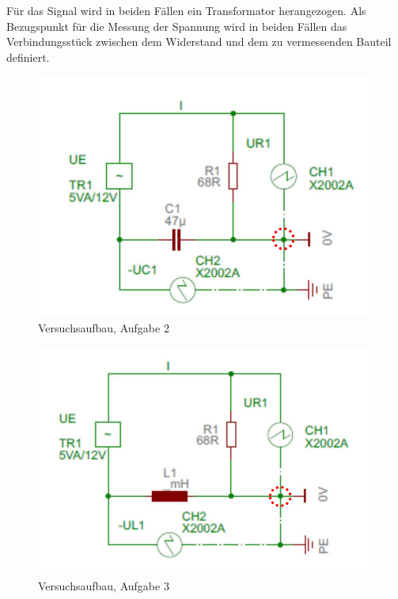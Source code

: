 \documentclass{article}
\begin{document}
Für das Signal wird in beiden Fällen ein Transformator herangezogen. Als Bezugspunkt für die Messung der Spannung wird in beiden Fällen das Verbindungsstück zwischen dem Widerstand und dem zu vermessenden Bauteil definiert.

\begin{figure}[H]
\centering
\caption{Versuchsaufbau, Aufgabe 2}
\label{fig:aufbau_task2}
\includegraphics[scale=1]{bilder/aufbau_task2.png}
\end{figure}



\begin{figure}[H]
\centering
\caption{Versuchsaufbau, Aufgabe 3}
\label{fig:aufbau_task3}
\includegraphics[scale=1]{bilder/aufbau_task3.png}
\end{figure}
\end{document}
